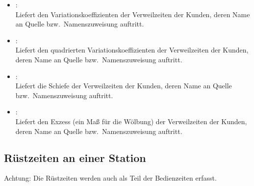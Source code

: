 \begin{itemize}
\item
{}:\\
Liefert den Variationskoeffizienten der Verweilzeiten der Kunden, deren Name an Quelle bzw.\ Namenszuweisung  auftritt.

\item
{}:\\
Liefert den quadrierten Variationskoeffizienten der Verweilzeiten der Kunden, deren Name an Quelle bzw.\ Namenszuweisung  auftritt.

\item
{}:\\
Liefert die Schiefe der Verweilzeiten der Kunden, deren Name an Quelle bzw.\ Namenszuweisung  auftritt.

\item
{}:\\
Liefert den Exzess (ein Maß für die Wölbung) der Verweilzeiten der Kunden, deren Name an Quelle bzw.\ Namenszuweisung  auftritt.

\end{itemize}  



\subsection{Rüstzeiten an einer Station}

Achtung: Die Rüstzeiten werden auch als Teil der Bedienzeiten erfasst.

